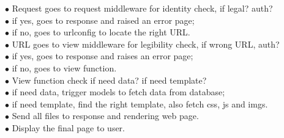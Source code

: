 $\bullet$ Request goes to request middleware for identity check, if legal? auth?\\
$\bullet$ if yes, goes to response and raised an error page;\\
$\bullet$ if no, goes to urlconfig to locate the right URL.\\
$\bullet$ URL goes to view middleware for legibility check, if wrong URL, auth?\\
$\bullet$ if yes, goes to response and raises an error page;\\
$\bullet$ if no, goes to view function. \\
$\bullet$ View function check if need data? if need template?\\
$\bullet$ if need data, trigger models to fetch data from database;\\
$\bullet$ if need template, find the right template, also fetch css, js and imgs.\\
$\bullet$ Send all files to response and rendering web page.\\
$\bullet$ Display the final page to user.



